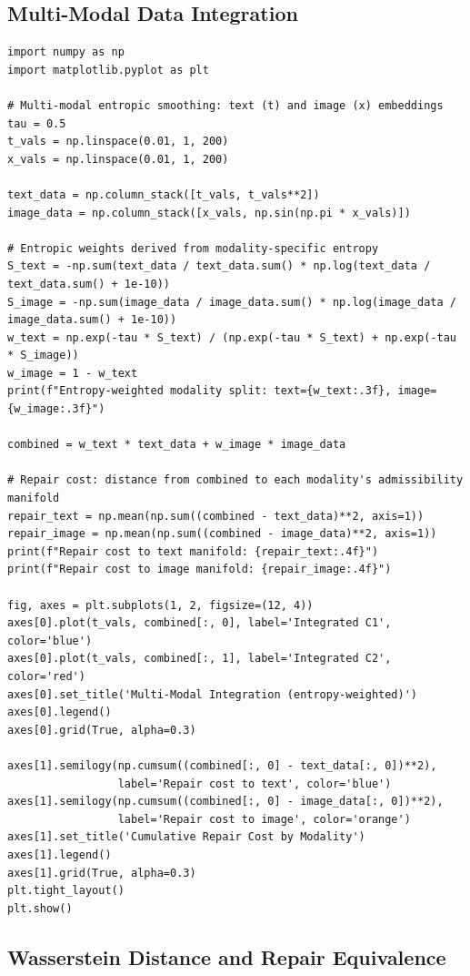 \documentclass[a4paper,12pt]{article}
\theoremstyle{definition}
\begin{document}
\subsection{Multi-Modal Data Integration}

\begin{lstlisting}
import numpy as np
import matplotlib.pyplot as plt

# Multi-modal entropic smoothing: text (t) and image (x) embeddings
tau = 0.5
t_vals = np.linspace(0.01, 1, 200)
x_vals = np.linspace(0.01, 1, 200)

text_data = np.column_stack([t_vals, t_vals**2])
image_data = np.column_stack([x_vals, np.sin(np.pi * x_vals)])

# Entropic weights derived from modality-specific entropy
S_text = -np.sum(text_data / text_data.sum() * np.log(text_data / text_data.sum() + 1e-10))
S_image = -np.sum(image_data / image_data.sum() * np.log(image_data / image_data.sum() + 1e-10))
w_text = np.exp(-tau * S_text) / (np.exp(-tau * S_text) + np.exp(-tau * S_image))
w_image = 1 - w_text
print(f"Entropy-weighted modality split: text={w_text:.3f}, image={w_image:.3f}")

combined = w_text * text_data + w_image * image_data

# Repair cost: distance from combined to each modality's admissibility manifold
repair_text = np.mean(np.sum((combined - text_data)**2, axis=1))
repair_image = np.mean(np.sum((combined - image_data)**2, axis=1))
print(f"Repair cost to text manifold: {repair_text:.4f}")
print(f"Repair cost to image manifold: {repair_image:.4f}")

fig, axes = plt.subplots(1, 2, figsize=(12, 4))
axes[0].plot(t_vals, combined[:, 0], label='Integrated C1', color='blue')
axes[0].plot(t_vals, combined[:, 1], label='Integrated C2', color='red')
axes[0].set_title('Multi-Modal Integration (entropy-weighted)')
axes[0].legend()
axes[0].grid(True, alpha=0.3)

axes[1].semilogy(np.cumsum((combined[:, 0] - text_data[:, 0])**2),
                 label='Repair cost to text', color='blue')
axes[1].semilogy(np.cumsum((combined[:, 0] - image_data[:, 0])**2),
                 label='Repair cost to image', color='orange')
axes[1].set_title('Cumulative Repair Cost by Modality')
axes[1].legend()
axes[1].grid(True, alpha=0.3)
plt.tight_layout()
plt.show()
\end{lstlisting}

\subsection{Wasserstein Distance and Repair Equivalence}
\end{document}
